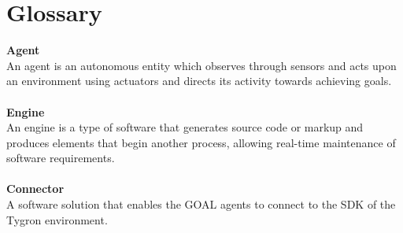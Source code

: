 \section{Glossary}

\textbf{Agent}\\
An agent is an autonomous entity which observes through sensors and acts upon an environment using actuators and directs its activity towards achieving goals.\\\\
\textbf{Engine}\\
An engine is a type of software that generates source code or markup and produces elements that begin another process, allowing real-time maintenance of software requirements.\\
\\
\textbf{Connector}\\
A software solution that enables the GOAL agents to connect to the SDK of the Tygron environment.
\textbf{}
\textbf{}